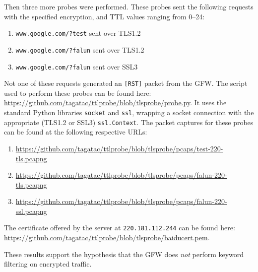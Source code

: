 Then three more probes were performed.
These probes sent the following requests with the specified encryption, and TTL values ranging from 0--24:
\begin{enumerate}\addtolength{\itemsep}{-.35\baselineskip}
	\item \texttt{www.google.com/?test} sent over TLS1.2
	\item \texttt{www.google.com/?falun} sent over TLS1.2
	\item \texttt{www.google.com/?falun} sent over SSL3
\end{enumerate}
Not one of these requests generated an \texttt{[RST]} packet from the GFW.
The script used to perform these probes can be found here: \url{https://github.com/tagatac/ttlprobe/blob/tlsprobe/probe.py}.
It uses the standard Python libraries \texttt{socket} and \texttt{ssl}, wrapping a socket connection with the appropriate (TLS1.2 or SSL3) \texttt{ssl.Context}.
The packet captures for these probes can be found at the following respective URLs:
\begin{enumerate}\addtolength{\itemsep}{-.35\baselineskip}
	\item \url{https://github.com/tagatac/ttlprobe/blob/tlsprobe/pcaps/test-220-tls.pcapng}
	\item \url{https://github.com/tagatac/ttlprobe/blob/tlsprobe/pcaps/falun-220-tls.pcapng}
	\item \url{https://github.com/tagatac/ttlprobe/blob/tlsprobe/pcaps/falun-220-ssl.pcapng}
\end{enumerate}
The certificate offered by the server at \texttt{220.181.112.244} can be found here: \url{https://github.com/tagatac/ttlprobe/blob/tlsprobe/baiducert.pem}.

These results support the hypothesis that the GFW does \textit{not} perform keyword filtering on encrypted traffic.
